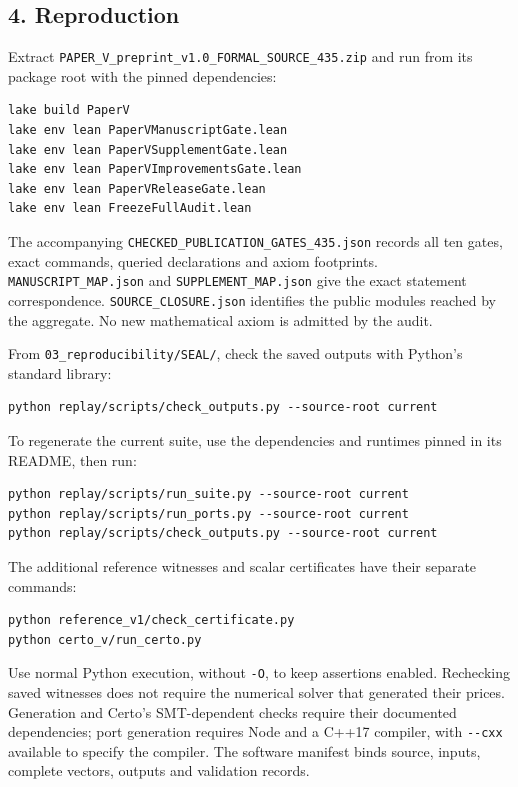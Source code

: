 \documentclass[english,11pt,a4paper]{article}
\begin{document}
\subsection{4. Reproduction}\label{reproduction}

Extract \nolinkurl{PAPER_V_preprint_v1.0_FORMAL_SOURCE_435.zip} and
run from its package root with the pinned dependencies:

\begin{verbatim}
lake build PaperV
lake env lean PaperVManuscriptGate.lean
lake env lean PaperVSupplementGate.lean
lake env lean PaperVImprovementsGate.lean
lake env lean PaperVReleaseGate.lean
lake env lean FreezeFullAudit.lean
\end{verbatim}

The accompanying \nolinkurl{CHECKED_PUBLICATION_GATES_435.json} records
all ten gates, exact commands, queried declarations and axiom
footprints. \nolinkurl{MANUSCRIPT_MAP.json} and
\nolinkurl{SUPPLEMENT_MAP.json} give the exact statement correspondence.
\nolinkurl{SOURCE_CLOSURE.json} identifies the public modules reached by
the aggregate. No new mathematical axiom is admitted by the audit.

From \nolinkurl{03_reproducibility/SEAL/}, check the saved outputs with
Python's standard library:

\begin{verbatim}
python replay/scripts/check_outputs.py --source-root current
\end{verbatim}

To regenerate the current suite, use the dependencies and runtimes
pinned in its README, then run:

\begin{verbatim}
python replay/scripts/run_suite.py --source-root current
python replay/scripts/run_ports.py --source-root current
python replay/scripts/check_outputs.py --source-root current
\end{verbatim}

The additional reference witnesses and scalar certificates have their
separate commands:

\begin{verbatim}
python reference_v1/check_certificate.py
python certo_v/run_certo.py
\end{verbatim}

Use normal Python execution, without \texttt{-O}, to keep assertions
enabled. Rechecking saved witnesses does not require the numerical
solver that generated their prices. Generation and Certo's SMT-dependent
checks require their documented dependencies; port generation requires
Node and a C++17 compiler, with \texttt{-\/-cxx} available to specify
the compiler. The software manifest binds source, inputs, complete
vectors, outputs and validation records.
\end{document}

